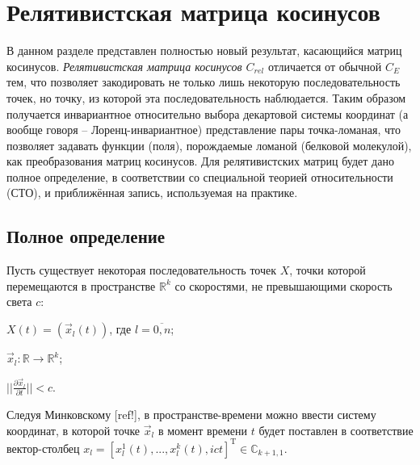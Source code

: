 

\section{Релятивистская матрица косинусов}

В данном разделе представлен полностью новый результат, касающийся матриц косинусов. \textit{Релятивистская матрица косинусов $C_{rel}$} отличается от обычной $C_E$ тем, что позволяет закодировать не только лишь некоторую последовательность точек, но точку, из которой эта последовательность наблюдается. Таким образом получается инвариантное относительно выбора декартовой системы координат (а вообще говоря -- Лоренц-инвариантное) представление пары точка-ломаная, что позволяет задавать функции (поля), порождаемые ломаной (белковой молекулой), как преобразования матриц косинусов. Для релятивистских матриц будет дано полное определение, в соответствии со специальной теорией относительности (СТО), и приближённая запись, используемая на практике.

\subsection{Полное определение}

Пусть существует некоторая последовательность точек $X$, точки которой перемещаются в пространстве $\mathbb{R}^{k}$ со скоростями, не превышающими скорость света $c$:

$X(t) = (\vec{x}_{l}(t))$, где $l = \overline{0,n}$;

$\vec{x}_l : \mathbb{R} \rightarrow \mathbb{R}^{k}$;

$||\frac{\partial{\vec{x}_l}}{\partial{t}}|| < c$.

Следуя Минковскому [ref!], в пространстве-времени можно ввести систему координат, в которой точке $\vec{x}_l$ в момент времени $t$ будет поставлен в соответствие вектор-столбец $x_l = [x^1_l(t), ..., x^k_l(t), ict]^\mathrm{T} \in \mathbb{C}_{k+1,1}$.

